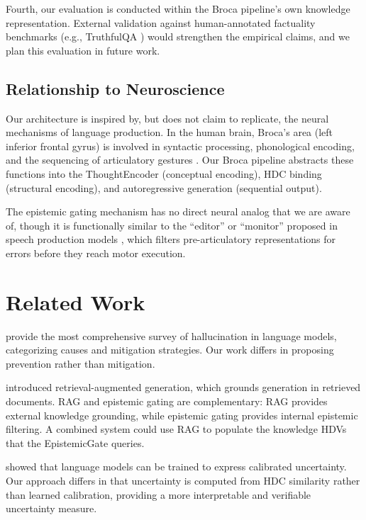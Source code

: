 \documentclass[12pt,a4paper]{article}
\begin{document}
Fourth, our evaluation is conducted within the Broca pipeline's own knowledge representation. External validation against human-annotated factuality benchmarks (e.g., TruthfulQA \citep{lin2022truthfulqa}) would strengthen the empirical claims, and we plan this evaluation in future work.

\subsection{Relationship to Neuroscience}

Our architecture is inspired by, but does not claim to replicate, the neural mechanisms of language production. In the human brain, Broca's area (left inferior frontal gyrus) is involved in syntactic processing, phonological encoding, and the sequencing of articulatory gestures \citep{hagoort2005broca}. Our Broca pipeline abstracts these functions into the ThoughtEncoder (conceptual encoding), HDC binding (structural encoding), and autoregressive generation (sequential output).

The epistemic gating mechanism has no direct neural analog that we are aware of, though it is functionally similar to the ``editor'' or ``monitor'' proposed in speech production models \citep{levelt1989speaking}, which filters pre-articulatory representations for errors before they reach motor execution.

\section{Related Work}

\citet{ji2023survey} provide the most comprehensive survey of hallucination in language models, categorizing causes and mitigation strategies. Our work differs in proposing prevention rather than mitigation.

\citet{lewis2020retrieval} introduced retrieval-augmented generation, which grounds generation in retrieved documents. RAG and epistemic gating are complementary: RAG provides external knowledge grounding, while epistemic gating provides internal epistemic filtering. A combined system could use RAG to populate the knowledge HDVs that the EpistemicGate queries.

\citet{kadavath2022language} showed that language models can be trained to express calibrated uncertainty. Our approach differs in that uncertainty is computed from HDC similarity rather than learned calibration, providing a more interpretable and verifiable uncertainty measure.
\end{document}
